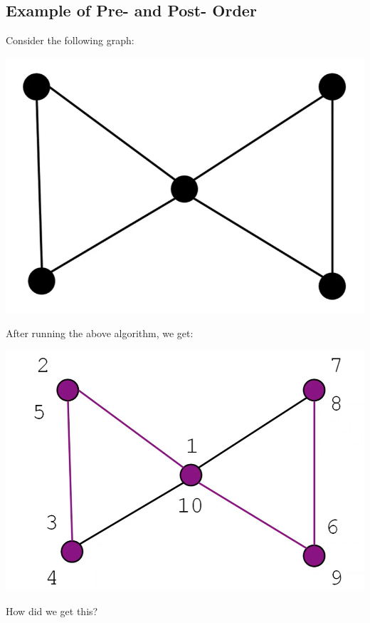 \documentclass[letterpaper]{article}
\begin{document}
\subsection{Example of Pre- and Post- Order}
Consider the following graph:
\begin{center}
    \includegraphics[scale=0.3]{../assets/graph_tri.png}
\end{center}
After running the above algorithm, we get:
\begin{center}
    \includegraphics[scale=0.3]{../assets/graph_tri_2.png}
\end{center}
How did we get this? 
\end{document}
